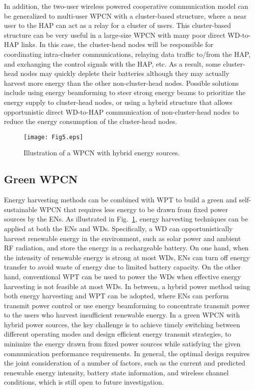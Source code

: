 \documentclass[journal, draftcls, one column, 12pt]{IEEEtran}
\begin{document}
In addition, the two-user wireless powered cooperative communication model can be generalized to multi-user WPCN with a cluster-based structure, where a near user to the HAP can act as a relay for a cluster of users. This cluster-based structure can be very useful in a large-size WPCN with many poor direct WD-to-HAP links. In this case, the cluster-head nodes will be responsible for coordinating intra-cluster communications, relaying data traffic to/from the HAP, and exchanging the control signals with the HAP, etc. As a result, some cluster-head nodes may quickly deplete their batteries although they may actually harvest more energy than the other non-cluster-head nodes. Possible solutions include using energy beamforming to steer strong energy beams to prioritize the energy supply to cluster-head nodes, or using a hybrid structure that allows opportunistic direct WD-to-HAP communication of non-cluster-head nodes to reduce the energy consumption of the cluster-head nodes.


\begin{figure}
\centering
  \begin{center}
    \texttt{[image: Fig5.eps]}
  \end{center}
  \caption{Illustration of a WPCN with hybrid energy sources.}
  \label{75}
\end{figure}

\subsection{Green WPCN}
Energy harvesting methods can be combined with WPT to build a green and self-sustainable WPCN that requires less energy to be drawn from fixed power sources by the ENs. As illustrated in Fig.~\ref{75}, energy harvesting techniques can be applied at both the ENs and WDs. Specifically, a WD can opportunistically harvest renewable energy in the environment, such as solar power and ambient RF radiation, and store the energy in a rechargeable battery. On one hand, when the intensity of renewable energy is strong at most WDs, ENs can turn off energy transfer to avoid waste of energy due to limited battery capacity. On the other hand, conventional WPT can be used to power the WDs when effective energy harvesting is not feasible at most WDs. In between, a hybrid power method using both energy harvesting and WPT can be adopted, where ENs can perform transmit power control or use energy beamforming to concentrate transmit power to the users who harvest insufficient renewable energy. In a green WPCN with hybrid power sources, the key challenge is to achieve timely switching between different operating modes and design efficient energy transmit strategies, to minimize the energy drawn from fixed power sources while satisfying the given communication performance requirements. In general, the optimal design requires the joint consideration of a number of factors, such as the current and predicted renewable energy intensity, battery state information, and wireless channel conditions, which is still open to future investigation.
\end{document}
